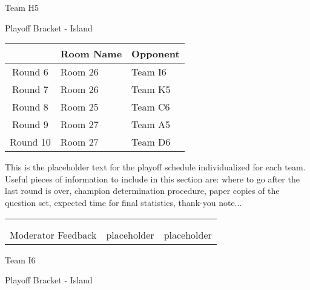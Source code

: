 \documentclass{article}%
\begin{document}
\newpage%
\begin{center}%
\begin{Huge}%
Team H5%
\end{Huge}%
\vspace*{12pt}%
\linebreak%
\begin{Large}%
Playoff Bracket {-} Island%
\end{Large}%
\end{center}%
\vspace*{4pt}%
%
\begin{tabularx}{\textwidth}{|c|Y|Y|}%
\hline%
&Room Name&Opponent\\%
\hline%
Round 6&Room 26&Team I6\\%
Round 7&Room 26&Team K5\\%
Round 8&Room 25&Team C6\\%
Round 9&Room 27&Team A5\\%
Round 10&Room 27&Team D6\\%
\hline%
\end{tabularx}%
\vspace*{30pt}%
\linebreak%
This is the placeholder text for the playoff schedule individualized for each team. Useful pieces of information to include in this section are: where to go after the last round is over, champion determination procedure, paper copies of the question set, expected time for final statistics, thank{-}you note...%
\vspace*{30pt}%
\newline%
%
\begin{tabularx}{\textwidth}{YYY}%
  &  &  \\%
\\%
Moderator Feedback&placeholder&placeholder\\%
\end{tabularx}%
\newpage%
\begin{center}%
\begin{Huge}%
Team I6%
\end{Huge}%
\vspace*{12pt}%
\linebreak%
\begin{Large}%
Playoff Bracket {-} Island%
\end{Large}%
\end{center}%
\end{document}
